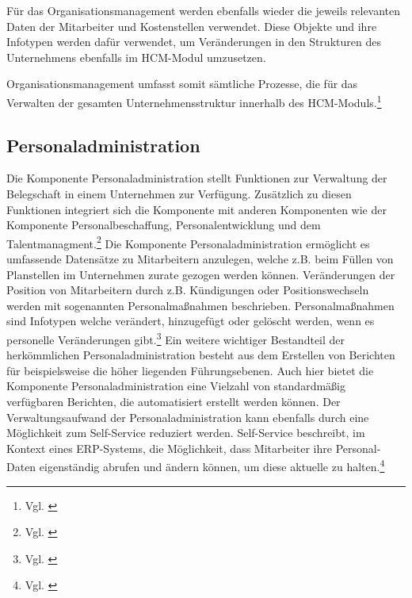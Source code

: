 Für das Organisationsmanagement werden ebenfalls wieder die jeweils relevanten Daten der Mitarbeiter und Kostenstellen verwendet. Diese Objekte und ihre Infotypen werden dafür verwendet, um Veränderungen in den Strukturen des Unternehmens ebenfalls im HCM-Modul umzusetzen.

Organisationsmanagement umfasst somit sämtliche Prozesse, die für das Verwalten der gesamten Unternehmensstruktur innerhalb des HCM-Moduls.\footnote{Vgl. \cite{SAPSE2024a}}

\subsection{Personaladministration}
Die Komponente Personaladministration stellt Funktionen zur Verwaltung der Belegschaft in einem Unternehmen zur Verfügung. Zusätzlich zu diesen Funktionen integriert sich die Komponente mit anderen Komponenten wie der Komponente Personalbeschaffung, Personalentwicklung und dem Talentmanagment.\footnote{Vgl. \cite{SAPSE2022}}
Die Komponente Personaladministration ermöglicht es umfassende Datensätze zu Mitarbeitern anzulegen, welche z.B. beim Füllen von Planstellen im Unternehmen zurate gezogen werden können. Veränderungen
der Position von Mitarbeitern durch z.B. Kündigungen oder Positionswechseln werden mit sogenannten Personalmaßnahmen beschrieben. Personalmaßnahmen sind Infotypen welche verändert, hinzugefügt oder gelöscht werden, wenn es personelle Veränderungen gibt.\footnote{Vgl. \cite{SAPSE2023a}}
Ein weitere wichtiger Bestandteil der herkömmlichen Personaladministration besteht aus dem Erstellen von Berichten für beispielsweise die höher liegenden Führungsebenen. Auch hier bietet die Komponente Personaladministration eine Vielzahl von standardmäßig verfügbaren Berichten, die automatisiert erstellt werden können.
Der Verwaltungsaufwand der Personaladministration kann ebenfalls durch eine Möglichkeit zum Self-Service reduziert werden. Self-Service beschreibt, im Kontext eines ERP-Systems, die Möglichkeit, dass Mitarbeiter ihre Personal-Daten eigenständig abrufen und ändern können, um diese aktuelle zu halten.\footnote{Vgl. \cite{SAPSE2023}}

